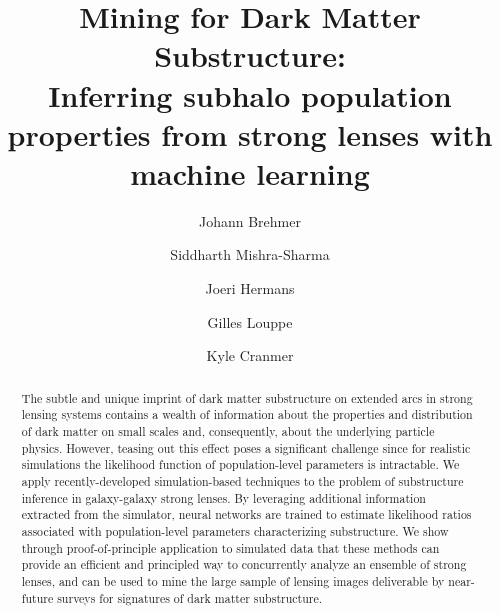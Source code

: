\documentclass[twocolumn]{aastex63}
\begin{document}
\sloppy\sloppypar\raggedbottom\frenchspacing

\title{\textbf{
Mining for Dark Matter Substructure: \\
Inferring subhalo population properties from strong lenses with machine learning
}}


\author[0000-0003-3344-4209]{Johann Brehmer}

\author[0000-0001-9088-7845]{Siddharth Mishra-Sharma}

\author[0000-0002-1471-2063]{Joeri Hermans}

\author[0000-0002-2082-3106]{Gilles Louppe}

\author[0000-0002-5769-7094]{Kyle Cranmer}

\begin{abstract}\noindent
The subtle and unique imprint of dark matter substructure on extended arcs in strong lensing systems contains a wealth of information about the properties and distribution of dark matter on small scales and, consequently, about the underlying particle physics. However, teasing out this effect poses a significant challenge since for realistic simulations the likelihood function of population-level parameters is intractable. We apply recently-developed simulation-based techniques to the problem of substructure inference in galaxy-galaxy strong lenses. By leveraging additional information extracted from the simulator, neural networks are trained to estimate likelihood ratios associated with population-level parameters characterizing substructure. We show through proof-of-principle application to simulated data that these methods can provide an efficient and principled way to concurrently analyze an ensemble of strong lenses, and can be used to mine the large sample of lensing images deliverable by near-future surveys for signatures of dark matter substructure. \href{https://github.com/smsharma/StrongLensing-Inference}{\faGithub} \href{https://doi.org/}{\faTags}
\end{abstract}
\end{document}
